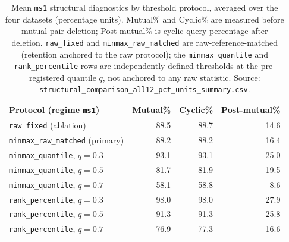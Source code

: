 \documentclass[manuscript,anonymous,review]{acmart}
\begin{document}
\begin{table}[t]
  \caption{Mean \texttt{ms1} structural diagnostics by threshold protocol,
    averaged over the four datasets (percentage units). Mutual\% and
    Cyclic\% are measured before mutual-pair deletion; Post-mutual\% is
    cyclic-query percentage after deletion. \texttt{raw\_fixed} and
    \texttt{minmax\_raw\_matched} are raw-reference-matched (retention
    anchored to the raw protocol); the \texttt{minmax\_quantile} and
    \texttt{rank\_percentile} rows are independently-defined thresholds at
    the pre-registered quantile $q$, not anchored to any raw statistic.
    Source: \texttt{structural\_comparison\_all12\_pct\_units\_summary.csv}.}
  \label{tab:structural-sensitivity-range}
  \scriptsize
  \begin{tabular}{lrrr}
    \toprule
    Protocol (regime \texttt{ms1}) & Mutual\% & Cyclic\% & Post-mutual\% \\
    \midrule
    \texttt{raw\_fixed} (ablation)                & 88.5 & 88.7 & 14.6 \\
    \texttt{minmax\_raw\_matched} (primary)        & 88.2 & 88.2 & 16.4 \\
    \texttt{minmax\_quantile}, $q=0.3$             & 93.1 & 93.1 & 25.0 \\
    \texttt{minmax\_quantile}, $q=0.5$             & 81.7 & 81.9 & 19.5 \\
    \texttt{minmax\_quantile}, $q=0.7$             & 58.1 & 58.8 & 8.6 \\
    \texttt{rank\_percentile}, $q=0.3$             & 98.0 & 98.0 & 27.9 \\
    \texttt{rank\_percentile}, $q=0.5$             & 91.3 & 91.3 & 25.8 \\
    \texttt{rank\_percentile}, $q=0.7$             & 76.9 & 77.3 & 16.6 \\
    \bottomrule
  \end{tabular}
\end{table}
\end{document}

